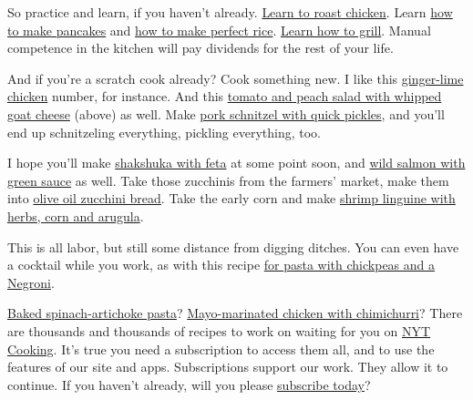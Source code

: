 So practice and learn, if you haven't already.
\href{https://cooking.nytimes3xbfgragh.onion/guides/11-how-to-roast-chicken}{Learn
to roast chicken}. Learn
\href{https://cooking.nytimes3xbfgragh.onion/guides/24-how-to-make-pancakes}{how
to make pancakes} and
\href{https://cooking.nytimes3xbfgragh.onion/guides/49-how-to-make-rice}{how
to make perfect rice}.
\href{https://cooking.nytimes3xbfgragh.onion/guides/7-how-to-grill}{Learn
how to grill}. Manual competence in the kitchen will pay dividends for
the rest of your life.

And if you're a scratch cook already? Cook something new. I like this
\href{https://cooking.nytimes3xbfgragh.onion/recipes/1021294-ginger-lime-chicken}{ginger-lime
chicken} number, for instance. And this
\href{https://cooking.nytimes3xbfgragh.onion/recipes/1020367-tomato-and-peach-salad-with-whipped-goat-cheese}{tomato
and peach salad with whipped goat cheese} (above) as well. Make
\href{https://cooking.nytimes3xbfgragh.onion/recipes/1016866-pork-schnitzel-with-quick-pickles}{pork
schnitzel with quick pickles}, and you'll end up schnitzeling
everything, pickling everything, too.

I hope you'll make
\href{https://cooking.nytimes3xbfgragh.onion/recipes/1014721-shakshuka-with-feta}{shakshuka
with feta} at some point soon, and
\href{https://cooking.nytimes3xbfgragh.onion/recipes/1014868-wild-salmon-with-green-sauce}{wild
salmon with green sauce} as well. Take those zucchinis from the farmers'
market, make them into
\href{https://cooking.nytimes3xbfgragh.onion/recipes/1017522-olive-oil-zucchini-bread}{olive
oil zucchini bread}. Take the early corn and make
\href{https://cooking.nytimes3xbfgragh.onion/recipes/1020354-shrimp-linguine-with-herbs-corn-and-arugula}{shrimp
linguine with herbs, corn and arugula}.

This is all labor, but still some distance from digging ditches. You can
even have a cocktail while you work, as with this recipe
\href{https://cooking.nytimes3xbfgragh.onion/recipes/1020019-pasta-with-chickpeas-and-a-negroni}{for
pasta with chickpeas and a Negroni}.

\href{https://cooking.nytimes3xbfgragh.onion/recipes/1020080-baked-spinach-artichoke-pasta}{Baked
spinach-artichoke pasta}?
\href{https://cooking.nytimes3xbfgragh.onion/recipes/1020543-mayo-marinated-chicken-with-chimichurri}{Mayo-marinated
chicken with chimichurri}? There are thousands and thousands of recipes
to work on waiting for you on
\href{https://cooking.nytimes3xbfgragh.onion/}{NYT Cooking}. It's true
you need a subscription to access them all, and to use the features of
our site and apps. Subscriptions support our work. They allow it to
continue. If you haven't already, will you please
\href{https://www.nytimes3xbfgragh.onion/subscription/cooking.html?campaignId=6XQHR}{subscribe
today}?

